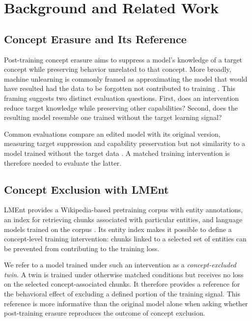 \section{Background and Related Work}
\label{sec:related-work}

\subsection{Concept Erasure and Its Reference}

Post-training concept erasure aims to suppress a model's knowledge of a target
concept while preserving behavior unrelated to that concept. More broadly,
machine unlearning is commonly framed as approximating the model that would
have resulted had the data to be forgotten not contributed to training
\citep{wichert2024rethinking}. This framing suggests two distinct evaluation
questions. First, does an intervention reduce target knowledge while
preserving other capabilities? Second, does the resulting model resemble one
trained without the target learning signal?

Common evaluations compare an edited model with its original version, measuring
target suppression and capability preservation but not similarity to a model
trained without the target data \citep{yao2024machineunlearning,li2024wmdp}.
A matched training intervention is therefore needed to evaluate the latter.

\subsection{Concept Exclusion with LMEnt}

LMEnt provides a Wikipedia-based pretraining corpus with entity annotations,
an index for retrieving chunks associated with particular entities, and
language models trained on the corpus \citep{gottesman2025lment}. Its entity
index makes it possible to define a concept-level training intervention:
chunks linked to a selected set of entities can be prevented from contributing
to the training loss.

We refer to a model trained under such an intervention as a
\emph{concept-excluded twin}. A twin is trained under otherwise matched
conditions but receives no loss on the selected concept-associated chunks. It
therefore provides a reference for the behavioral effect of excluding a
defined portion of the training signal. This reference is more informative
than the original model alone when asking whether post-training erasure
reproduces the outcome of concept exclusion.

